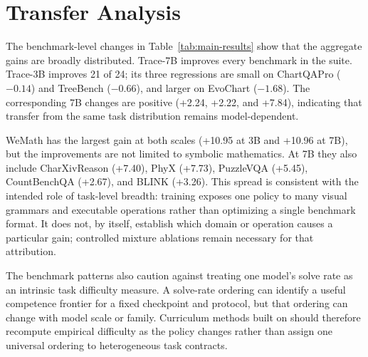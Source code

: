 \section{Transfer Analysis}
\label{sec:analysis}

The benchmark-level changes in Table~\ref{tab:main-results} show that the
aggregate gains are broadly distributed. Trace-7B improves every benchmark in
the suite. Trace-3B improves 21 of 24; its three regressions are small on
ChartQAPro ($-0.14$) and
TreeBench ($-0.66$), and larger on EvoChart ($-1.68$). The corresponding 7B
changes are positive (+2.24, +2.22, and +7.84), indicating that transfer from
the same task distribution remains model-dependent.

WeMath has the largest gain at both scales (+10.95 at 3B and +10.96 at 7B),
but the improvements are not limited to symbolic mathematics. At 7B they also
include CharXivReason (+7.40), PhyX (+7.73), PuzzleVQA (+5.45), CountBenchQA
(+2.67), and BLINK (+3.26). This spread is consistent with the intended role
of task-level breadth: \trace training exposes one policy to many visual
grammars and executable operations rather than optimizing a single benchmark
format. It does not, by itself, establish which domain or operation causes a
particular gain; controlled mixture ablations remain necessary for that
attribution.

The benchmark patterns also caution against treating one model's solve rate as
an intrinsic task difficulty measure. A solve-rate ordering can identify a
useful competence frontier for a fixed checkpoint and protocol, but that
ordering can change with model scale or family. Curriculum methods built on
\trace should therefore recompute empirical difficulty as the policy changes
rather than assign one universal ordering to heterogeneous task contracts.
